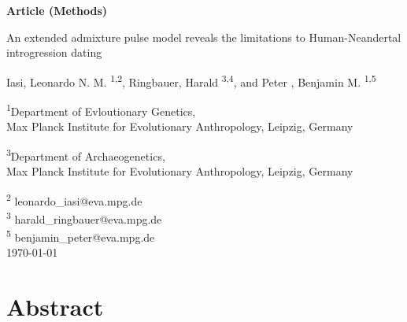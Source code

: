 \documentclass[11pt]{article}
\begin{document}
\begin{titlepage}

    \begin{flushright}
        \large
        \textbf{Article (Methods)}
    \end{flushright}


        \vspace*{1cm}
    \begin{center}       
        \Huge
        \vspace{1cm}
        An extended admixture pulse model reveals the limitations to Human-Neandertal introgression dating
        
        \vspace{1.0cm}
        \large
        Iasi, Leonardo N. M. \textsuperscript{1,2}, Ringbauer, Harald  \textsuperscript{3,4}, and Peter , Benjamin M. \textsuperscript{1,5} \\ 
        
        \vspace{1.0cm}
        
        \textsuperscript{1}Department of Evloutionary Genetics, \\ 
        Max Planck Institute for Evolutionary Anthropology, Leipzig, Germany
        
        \textsuperscript{3}Department of Archaeogenetics, \\ 
        Max Planck Institute for Evolutionary Anthropology, Leipzig, Germany
        
        \vspace{1.0cm}
        \textsuperscript{2} leonardo\_iasi@eva.mpg.de \\
        \textsuperscript{3} 
        harald\_ringbauer@eva.mpg.de \\\textsuperscript{5} 
        benjamin\_peter@eva.mpg.de \\
        \vspace{1.0cm}
        \today
    \end{center}  
     

            

\end{titlepage}


\section{Abstract}\label{sec:abstract}
\end{document}
